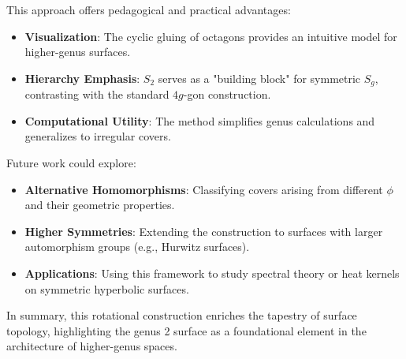 \documentclass{article}
\theoremstyle{definition}
\theoremstyle{remark}
\begin{document}
This approach offers pedagogical and practical advantages:
\begin{itemize}
    \item \textbf{Visualization}: The cyclic gluing of octagons provides an intuitive model for higher-genus surfaces.
    \item \textbf{Hierarchy Emphasis}: \(S_2\) serves as a "building block" for symmetric \(S_g\), contrasting with the standard \(4g\)-gon construction.
    \item \textbf{Computational Utility}: The method simplifies genus calculations and generalizes to irregular covers.
\end{itemize}

Future work could explore:
\begin{itemize}
    \item \textbf{Alternative Homomorphisms}: Classifying covers arising from different \(\phi\) and their geometric properties.
    \item \textbf{Higher Symmetries}: Extending the construction to surfaces with larger automorphism groups (e.g., Hurwitz surfaces).
    \item \textbf{Applications}: Using this framework to study spectral theory or heat kernels on symmetric hyperbolic surfaces.
\end{itemize}

In summary, this rotational construction enriches the tapestry of surface topology, highlighting the genus 2 surface as a foundational element in the architecture of higher-genus spaces.
\end{document}
